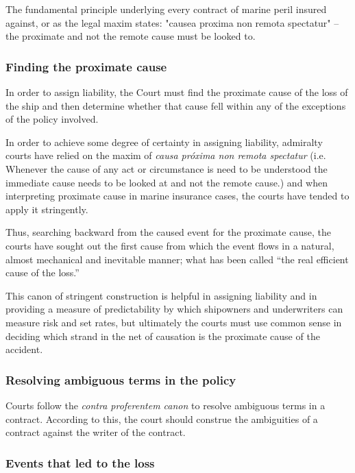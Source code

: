 The fundamental principle underlying every contract of marine peril insured against, or as the legal maxim states: "causea proxima non remota spectatur" -- the proximate and not the remote cause must be looked to. \cite{marineInsuranceAct55}

\subsubsection{Finding the proximate cause}

In order to assign liability, the Court must find the proximate cause of the loss of the ship and then
determine whether that cause fell within any of the exceptions of the policy involved.

In order to achieve some degree of certainty in assigning liability,
admiralty courts have relied on the maxim of \textit{causa próxima non remota spectatur} (i.e. Whenever the cause of any act or circumstance is need to be understood the immediate cause needs to be looked at and not the remote cause.)
and when interpreting  proximate cause in marine insurance cases, the courts have
tended to apply it stringently.

Thus, searching backward from the
caused event for the proximate cause, the courts have sought out the first cause
from which the event flows in a natural, almost mechanical and inevitable manner;
what has been called “the real efficient cause of the loss.”

This canon of stringent construction is helpful in assigning
liability and in providing a measure of predictability by which shipowners and
underwriters can measure risk and set rates, but ultimately the courts must use common sense in deciding which strand in the net of causation is the proximate cause of the accident.

\subsubsection{Resolving ambiguous terms in the policy}

Courts follow the \textit{contra proferentem canon} to resolve ambiguous terms in a contract. According to this, the court should construe the ambiguities of a contract against the writer of the contract. 

\subsubsection{Events that led to the loss}

